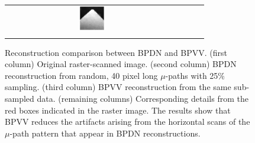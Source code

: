 \documentclass[twocolumn,oneside]{IEEEtran/IEEEtran}
\begin{document}
\begin{figure}[h!]
\begin{tabular}{cccccc}
    &\includegraphics[width=0.16\textwidth]{figures-SBA/anothergrating_bptv_40mu_zoomin}\\
    
    & 
    & 
    & 
    & 
    & 
  \end{tabular}
  \caption{Reconstruction comparison between BPDN and BPVV. (first column)
    Original raster-scanned image. (second column) BPDN reconstruction from
    random, 40 pixel long $\mu$-paths with 25\% sampling. (third column) BPVV
    reconstruction from the same sub-sampled data. (remaining columns)
    Corresponding details from the red boxes indicated in the raster image. The
    results show that BPVV reduces the artifacts arising from the horizontal
    scans of the $\mu$-path pattern that appear in BPDN reconstructions.}
  \label{fig:BPTV_demonstration}
\end{figure}
\endgroup
\end{document}
